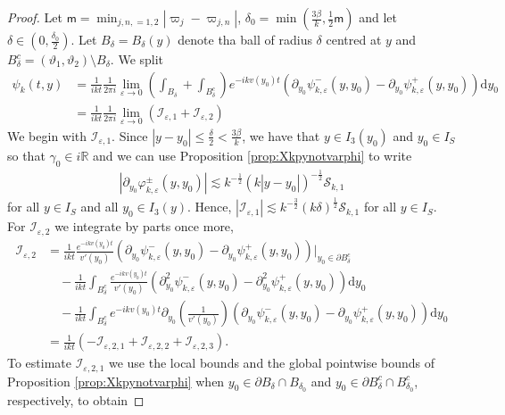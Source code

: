 \documentclass[11pt,reqno]{amsproc}
\theoremstyle{definition}
\numberwithin{equation}{section}
\newcommand{\cI}{{\mathcal I}}
\newcommand{\R}{{\mathbb R}}
\newcommand{\cS}{{\mathcal S}}
\renewcommand{\d}{\mathrm{d}}
\newcommand{\ep}{\varepsilon}
\begin{document}
\begin{proof}
Let $\mathsf{m}=\min_{j,n,=1,2}|\varpi_j-\varpi_{j,n}|$, $\delta_0= \min \left( \frac{3\beta}{k}, \frac12 \mathsf{m} \right)$ and let $\delta\in (0,\frac{\delta_0}{2})$. Let $B_\delta=B_\delta(y)$ denote tha ball of radius $\delta$ centred at $y$ and $B_{\delta}^c=(\vartheta_1,\vartheta_2)\setminus B_\delta$. We split
\begin{align*}
\psi_k(t,y) &= \frac{1}{ikt}\frac{1}{2\pi i }\lim_{\ep\rightarrow 0} \left( \int_{B_\delta} + \int_{B_\delta^c} \right) e^{-ikv(y_0) t} \left( \partial_{y_0}\psi_{k,\ep}^-(y,y_0) - \partial_{y_0}\psi_{k,\ep}^+(y,y_0) \right)  \d y_0 \\
&= \frac{1}{ikt}\frac{1}{2\pi i} \lim_{\ep\rightarrow 0} \left( \cI_{\ep,1} + \cI_{\ep,2} \right)
\end{align*}
We begin with $\cI_{\ep,1}$. Since $|y-y_0|\leq\frac{\delta}{2}< \frac{3\beta}{k}$, we have that $y\in I_3(y_0)$ and $y_0\in I_S$ so that $\gamma_0\in i \R$ and we can use Proposition \ref{prop:Xkpynotvarphi} to write
\begin{align*}
\left| \partial_{y_0}\varphi_{k,\ep}^\pm(y,y_0) \right| \lesssim k^{-\frac12}(k|y-y_0|)^{-\frac12}\cS_{k,1}
\end{align*}
for all $y\in I_S$ and all $y_0\in I_3(y)$. Hence, $|\cI_{\ep,1}|\lesssim k^{-\frac32}(k\delta)^\frac12 \cS_{k,1}$ for all $y\in I_S$. For $\cI_{\ep,2}$ we integrate by parts once more, 
\begin{align*}
\cI_{\ep,2} &= \frac{1}{ikt} \frac{e^{-ikv(y_0)t }}{v'(y_0)}\left( \partial_{y_0}\psi_{k,\ep}^-(y,y_0) - \partial_{y_0}\psi_{k,\ep}^+(y,y_0) \right)  \Big|_{y_0\in \partial B_\delta^c} \\
&\quad - \frac{1}{ikt}\int_{B_\delta^c}  \frac{e^{-ikv(y_0)t }}{v'(y_0)}\left( \partial^2_{y_0}\psi_{k,\ep}^-(y,y_0) - \partial^2_{y_0}\psi_{k,\ep}^+(y,y_0) \right)  \d y_0 \\
&\quad - \frac{1}{ikt}\int_{B_\delta^c}  {e^{-ikv(y_0)t }}\partial_{y_0}\left(\frac{1}{v'(y_0)}\right)\left( \partial_{y_0}\psi_{k,\ep}^-(y,y_0) - \partial_{y_0}\psi_{k,\ep}^+(y,y_0) \right)  \d y_0\\
&= \frac{1}{ikt}\left( - \cI_{\ep,2,1} + \cI_{\ep,2,2} + \cI_{\ep,2,3} \right).
\end{align*}
To estimate $\cI_{\ep,2,1}$ we use the local bounds and the global pointwise bounds of Proposition \ref{prop:Xkpynotvarphi} when $y_0\in \partial B_{\delta}\cap B_{\delta_0}$ and $y_0\in \partial B_\delta^c \cap B_{\delta_0}^c$, respectively, to obtain

\end{proof}
\end{document}
